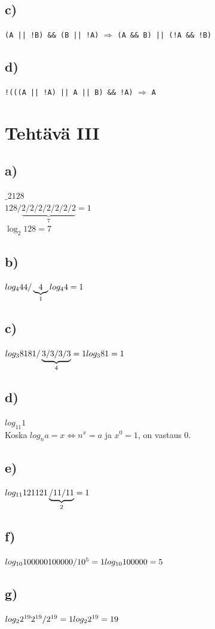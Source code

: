 \documentclass[a4paper, 12pt]{article}
\begin{document}
\subsection*{c)}
\texttt{(A || !B) \&\& (B || !A)} $\Rightarrow$ \texttt{(A \&\& B) || (!A \&\& !B)}
\subsection*{d)}
\texttt{!(((A || !A) || A || B) \&\& !A)} $\Rightarrow$ \texttt{A}

\section*{Tehtävä III}
\subsection*{a)}
$\_{2}128$ \\
$128/\underbrace{2/2/2/2/2/2/2}_\text{7}=1$ \\
$\log_{2}128=7$
\subsection*{b)}
$log_{4}4 \\
4/\underbrace{4}_\text{1}\\
log_{4}4=1$
\subsection*{c)}
$log_{3} 81 \\
81/\underbrace{3/3/3/3}_{4}=1 \\
log_{3}81=1
$
\subsection*{d)}
$log_{11}1$\\
Koska $log_{n}a=x \Leftrightarrow n^{x}=a$ ja $x^{0}=1$, on vastaus $0$.
\subsection*{e)}
$log_{11}121\\
121\underbrace{/11/11}_{2}=1$
\subsection*{f)}
$log_{10}100000\\
100000/10^{5}=1\\
log_{10}100000=5$
\subsection*{g)}
$log_{2}2^{19}\\
2^{19}/2^{19}=1\\
log_{2}2^{19}=19$
\end{document}
